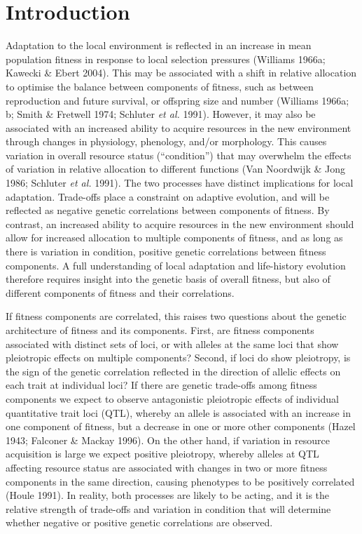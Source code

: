 \documentclass[12pt,]{article}
\begin{document}
\hypertarget{introduction}{%
\section{Introduction}\label{introduction}}

Adaptation to the local environment is reflected in an increase in mean population fitness in response to local selection pressures (Williams 1966a; Kawecki \& Ebert 2004).
This may be associated with a shift in relative allocation to optimise the balance between components of fitness, such as between reproduction and future survival, or offspring size and number (Williams 1966a; b; Smith \& Fretwell 1974; Schluter \emph{et al.} 1991).
However, it may also be associated with an increased ability to acquire resources in the new environment through changes in physiology, phenology, and/or morphology.
This causes variation in overall resource status (``condition'') that may overwhelm the effects of variation in relative allocation to different functions (Van Noordwijk \& Jong 1986; Schluter \emph{et al.} 1991).
The two processes have distinct implications for local adaptation.
Trade-offs place a constraint on adaptive evolution, and will be reflected as negative genetic correlations between components of fitness.
By contrast, an increased ability to acquire resources in the new environment should allow for increased allocation to multiple components of fitness, and as long as there is variation in condition, positive genetic correlations between fitness components.
A full understanding of local adaptation and life-history evolution therefore requires insight into the genetic basis of overall fitness, but also of different components of fitness and their correlations.

If fitness components are correlated, this raises two questions about the genetic architecture of fitness and its components.
First, are fitness components associated with distinct sets of loci, or with alleles at the same loci that show pleiotropic effects on multiple components?
Second, if loci do show pleiotropy, is the sign of the genetic correlation reflected in the direction of allelic effects on each trait at individual loci?
If there are genetic trade-offs among fitness components we expect to observe antagonistic pleiotropic effects of individual quantitative trait loci (QTL), whereby an allele is associated with an increase in one component of fitness, but a decrease in one or more other components (Hazel 1943; Falconer \& Mackay 1996).
On the other hand, if variation in resource acquisition is large we expect positive pleiotropy, whereby alleles at QTL affecting resource status are associated with changes in two or more fitness components in the same direction, causing phenotypes to be positively correlated (Houle 1991).
In reality, both processes are likely to be acting, and it is the relative strength of trade-offs and variation in condition that will determine whether negative or positive genetic correlations are observed.
\end{document}
